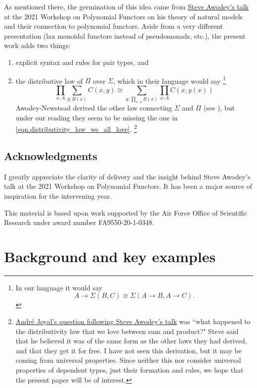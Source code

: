 \documentclass[11pt, one side, article]{memoir}
\theoremstyle{definition}
\theoremstyle{plain}
\newcommand{\0}{\textsf{0}}
\newcommand{\1}{\tn{\textsf{1}}}
\begin{document}
As mentioned there, the germination of this idea came from \href{https://www.youtube.com/watch?v=RDuNIP4icKI\&t=10765s}{Steve Awodey's talk} at the 2021 Workshop on Polynomial Functors on his theory of natural models and their connection to polynomial functors. Aside from a very different presentation (lax monoidal functors instead of pseudomonads, etc.), the present work adds two things:
\begin{enumerate}
	\item explicit syntax and rules for pair types, and
	\item the distributive law of $\Pi$ over $\Sigma$, which in their language would say%
	\footnote{In our language it would say 
	\[
	A\to\Sigma(B,C)\cong \Sigma(A\to B,A\to C).
	\]
	}
	\begin{equation}\label{eqn.distributivity_law_we_all_love}
	\prod_{x:A}\sum_{y:B(x)}C(x,y)\cong\sum_{y:\prod_{x:A}B(x)}\prod_{x:A}C(x,y(x))
	\end{equation}
	Awodey-Newstead derived the other law connecting $\Sigma$ and $\Pi$ (see \cite[Remark 4.2]{awodey2018polynomial}), but under our reading they seem to be missing the one in \eqref{eqn.distributivity_law_we_all_love}.%
	\footnote{\href{https://youtu.be/RDuNIP4icKI?t=13898}{Andr\'{e} Joyal's question following Steve Awodey's talk} was ``what happened to the distributivity law that we love between sum and product?" Steve said that he believed it was of the same form as the other laws they had derived, and that they get it for free. I have not seen this derivation, but it may be coming from universal properties. Since neither this nor \cite{awodey2018polynomial} consider universal properties of dependent types, just their formation and rules, we hope that the present paper will be of interest.
	}
\end{enumerate}

\section{Acknowledgments}

I greatly appreciate the clarity of delivery and the insight behind Steve Awodey's talk at the 2021 Workshop on Polynomial Functors. It has been a major source of inspiration for the intervening year.

This material is based upon work supported by the Air Force Office of Scientific Research under award number FA9550-20-1-0348.

\chapter{Background and key examples}
\end{document}
